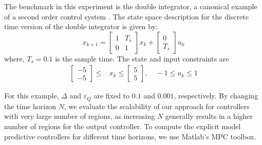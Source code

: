 The benchmark in this experiment is the double integrator, a canonical example
of a second order control system . The state space description
for the discrete time version of the double integrator is given by:
\begin{equation}
x_{k+1}=
\begin{bmatrix}
1 & T_s\\
0& 1	
\end{bmatrix}
x_k+
\begin{bmatrix}
0\\
T_s
\end{bmatrix}u_k
\label{eq:int2_ss}
\end{equation}
where, $T_s=0.1$ is the sample time. The state and input constraints are
\begin{align*}
	\begin{bmatrix}
		-5\\-5
	\end{bmatrix}\leq&
	x_k\leq
	\begin{bmatrix}
	5\\5
	\end{bmatrix}, \quad
	-1\leq u_k \leq 1
\end{align*}%


For this example, $\Delta$ and $\varepsilon_Q$ are fixed to $0.1$ and $0.001$,
respectively. By changing the time horizon $N$, we evaluate the scalability
of our approach for controllers with very large number of regions, as 
increasing $N$ generally results in a higher number of regions for the output controller. To
compute the explicit model predictive controllers for different time horizons,
we use Matlab's MPC toolbox. 
 

